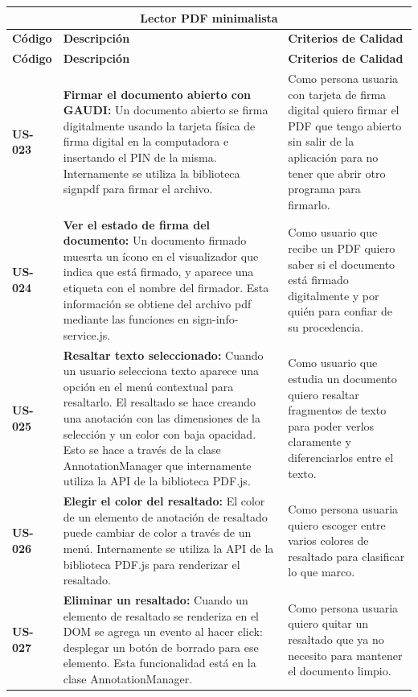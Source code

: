 \begin{longtable}{|l||p{7cm}|p{4.5cm}|}

\multicolumn{3}{c}{Lector PDF minimalista}\\
\hline
\textbf{Código} & \textbf{Descripción} & \textbf{Criterios de Calidad}\\
\hline\hline
\endfirsthead
\hline
\textbf{Código} & \textbf{Descripción} & \textbf{Criterios de Calidad}\\
\hline\hline
\endhead

\textbf{US-023} & \textbf{Firmar el documento abierto con GAUDI:} Un documento abierto se firma digitalmente usando la tarjeta física de firma digital en la computadora e insertando el PIN de la misma. Internamente se utiliza la biblioteca signpdf para firmar el archivo. & Como persona usuaria con tarjeta de firma digital quiero firmar el PDF que tengo abierto sin salir de la aplicación para no tener que abrir otro programa para firmarlo.\\
\hline
\textbf{US-024} & \textbf{Ver el estado de firma del documento:} Un documento firmado muesrta un ícono en el visualizador que indica que está firmado, y aparece una etiqueta con el nombre del firmador. Esta información se obtiene del archivo pdf mediante las funciones en sign-info-service.js.& Como usuario que recibe un PDF quiero saber si el documento está firmado digitalmente y por quién para confiar de su procedencia.\\
\hline
\textbf{US-025} & \textbf{Resaltar texto seleccionado:} Cuando un usuario selecciona texto aparece una opción en el menú contextual para resaltarlo. El resaltado se hace creando una anotación con las dimensiones de la selección y un color con baja opacidad. Esto se hace a través de la clase AnnotationManager que internamente utiliza la API de la biblioteca PDF.js.& Como usuario que estudia un documento quiero resaltar fragmentos de texto para poder verlos claramente y diferenciarlos entre el texto.\\
\hline
\textbf{US-026} & \textbf{Elegir el color del resaltado:} El color de un elemento de anotación de resaltado puede cambiar de color a través de un menú. Internamente se utiliza la API de la biblioteca PDF.js para renderizar el resaltado.& Como persona usuaria quiero escoger entre varios colores de resaltado para clasificar lo que marco.\\
\hline
\textbf{US-027} & \textbf{Eliminar un resaltado:} Cuando un elemento de resaltado se renderiza en el DOM se agrega un evento al hacer click: desplegar un botón de borrado para ese elemento. Esta funcionalidad está en la clase AnnotationManager. & Como persona usuaria quiero quitar un resaltado que ya no necesito para mantener el documento limpio.\\

\end{longtable}
